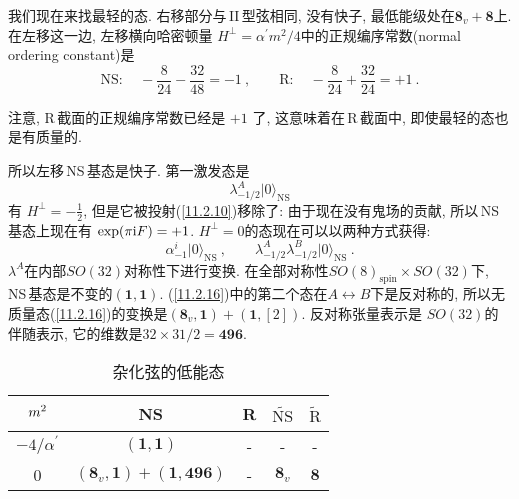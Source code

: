 我们现在来找最轻的态. 右移部分与\,II\,型弦相同, 没有快子, 最低能级处在$ \mathbf{8}_{v}+\mathbf{8} $上. 在左移这一边, 左移横向哈密顿量 $H^{\bot}=\alpha^{\prime}m^{2}/4 $中的正规编序常数(normal ordering constant)是
\begin{equation}
    \text{NS}:\quad -\frac{8}{24}-\frac{32}{48} =-1\:, \qquad \text{R}:\quad -\frac{8}{24}+\frac{32}{24}=+1\:.\label{11.2.14} 
\end{equation}
\begin{tcolorbox}
注意, R\,截面的正规编序常数已经是 $+1$ 了, 这意味着在\,R\,截面中, 即使最轻的态也是有质量的.
\end{tcolorbox}
\noindent 所以左移\,NS\,基态是快子. 第一激发态是
\begin{equation}
    \lambda^{A}_{-1/2}\lvert 0\rangle_{\text{NS}}  \label{11.2.15}
\end{equation}
有 $H^{\bot}=-\frac{1}{2}$, 但是它被投射(\ref{11.2.10})移除了: 由于现在没有鬼场的贡献, 所以\,NS\,基态上现在有 $\exp(\pi\mathrm{i} F)=+1$.
$H^{\bot}=0 $的态现在可以以两种方式获得:
\begin{equation}
\alpha_{-1}^{i}\lvert 0\rangle_{\text{NS}}\:,\qquad \lambda_{-1/2}^{A}\lambda_{-1/2}^{B}\lvert 0\rangle_{\text{NS}} \:. \label{11.2.16}    
\end{equation}
$\lambda^{A} $在内部$ SO(32) $对称性下进行变换. 在全部对称性$ SO(8)_{\text{spin}}\times SO(32) $下, NS\,基态是不变的$(\mathbf{1},\mathbf{1})$. (\ref{11.2.16})中的第二个态在$ A\leftrightarrow B $下是反对称的, 所以无质量态(\ref{11.2.16})的变换是$(\mathbf{8}_{v},\mathbf{1})+(\mathbf{1},[2])$. 反对称张量表示是 $SO(32) $的伴随表示, 它的维数是$ 32\times 31/2=\mathbf{496}$. 

\begin{table}[h]
\caption{杂化弦的低能态}
\label{tab:11.2}%
\centering
\begin{tabular}[c]{ccccc}
\hline\hline
 $\vphantom{\Bigl[}m^{2}$ & NS & R & $\widetilde{\text{NS}}$ & $\widetilde{\text{R}}$  \\
\hline
 $-4/\alpha^{\prime}$ & $(\mathbf{1},\mathbf{1})$ & - & - &  -  \\
 0 & $(\mathbf{8}_{v},\mathbf{1})+(\mathbf{1},\mathbf{496})$ & - & $\mathbf{8}_{v}$ & $\mathbf{8}$   \\
 \hline\hline
\end{tabular}
\end{table}

